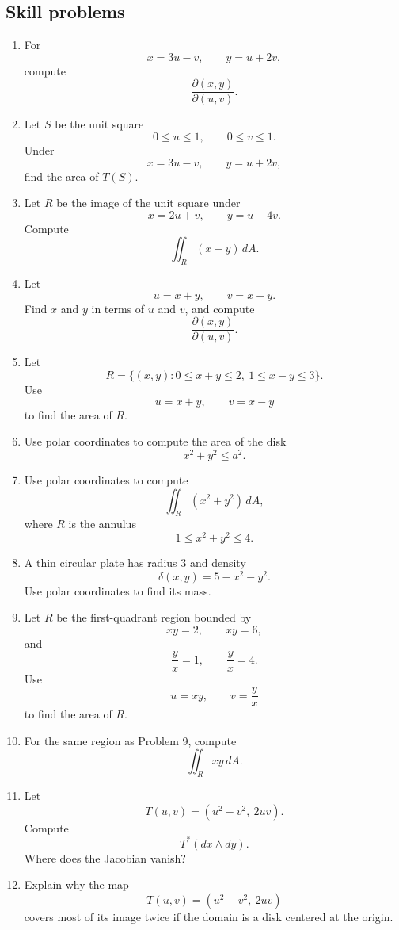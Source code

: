 \subsection{Skill problems}

\begin{enumerate}
\item For
\[
    x=3u-v,
    \qquad
    y=u+2v,
\]
compute
\[
    \frac{\partial(x,y)}{\partial(u,v)}.
\]

\item Let \(S\) be the unit square
\[
    0\le u\le1,\qquad 0\le v\le1.
\]
Under
\[
    x=3u-v,
    \qquad
    y=u+2v,
\]
find the area of \(T(S)\).

\item Let \(R\) be the image of the unit square under
\[
    x=2u+v,
    \qquad
    y=u+4v.
\]
Compute
\[
    \iint_R (x-y)\,dA.
\]

\item Let
\[
    u=x+y,
    \qquad
    v=x-y.
\]
Find \(x\) and \(y\) in terms of \(u\) and \(v\), and compute
\[
    \frac{\partial(x,y)}{\partial(u,v)}.
\]

\item Let
\[
    R=\{(x,y):0\le x+y\le2,\ 1\le x-y\le3\}.
\]
Use
\[
    u=x+y,
    \qquad
    v=x-y
\]
to find the area of \(R\).

\item Use polar coordinates to compute the area of the disk
\[
    x^2+y^2\le a^2.
\]

\item Use polar coordinates to compute
\[
    \iint_R (x^2+y^2)\,dA,
\]
where \(R\) is the annulus
\[
    1\le x^2+y^2\le4.
\]

\item A thin circular plate has radius \(3\) and density
\[
    \delta(x,y)=5-x^2-y^2.
\]
Use polar coordinates to find its mass.

\item Let \(R\) be the first-quadrant region bounded by
\[
    xy=2,\qquad xy=6,
\]
and
\[
    \frac{y}{x}=1,\qquad \frac{y}{x}=4.
\]
Use
\[
    u=xy,
    \qquad
    v=\frac{y}{x}
\]
to find the area of \(R\).

\item For the same region as Problem 9, compute
\[
    \iint_R xy\,dA.
\]

\item Let
\[
    T(u,v)=(u^2-v^2,\ 2uv).
\]
Compute
\[
    T^*(dx\wedge dy).
\]
Where does the Jacobian vanish?

\item Explain why the map
\[
    T(u,v)=(u^2-v^2,\ 2uv)
\]
covers most of its image twice if the domain is a disk centered at the origin.


\end{enumerate}

